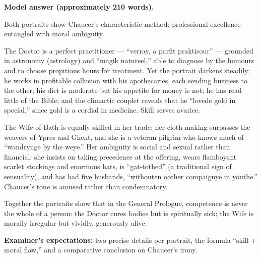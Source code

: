 \documentclass[11pt]{article}
\begin{document}
\begin{corrige}
\textbf{Model answer (approximately 210 words).}

Both portraits show Chaucer's characteristic method: professional excellence entangled with moral ambiguity.

The Doctor is a perfect practitioner --- ``verray, a parfit praktisour'' --- grounded in astronomy (astrology) and ``magik natureel,'' able to diagnose by the humours and to choose propitious hours for treatment. Yet the portrait darkens steadily: he works in profitable collusion with his apothecaries, each sending business to the other; his diet is moderate but his appetite for money is not; he has read little of the Bible; and the climactic couplet reveals that he ``lovede gold in special,'' since gold is a cordial in medicine. Skill serves avarice.

The Wife of Bath is equally skilled in her trade: her cloth-making surpasses the weavers of Ypres and Ghent, and she is a veteran pilgrim who knows much of ``wandrynge by the weye.'' Her ambiguity is social and sexual rather than financial: she insists on taking precedence at the offering, wears flamboyant scarlet stockings and enormous hats, is ``gat-tothed'' (a traditional sign of sensuality), and has had five husbands, ``withouten oother compaignye in youthe.'' Chaucer's tone is amused rather than condemnatory.

Together the portraits show that in the General Prologue, competence is never the whole of a person: the Doctor cures bodies but is spiritually sick; the Wife is morally irregular but vividly, generously alive.

\textbf{Examiner's expectations:} two precise details per portrait, the formula ``skill + moral flaw,'' and a comparative conclusion on Chaucer's irony.
\end{corrige}
\end{document}
